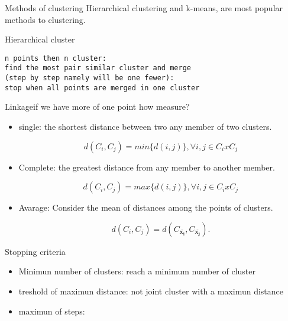 \documentclass{beamer}
\begin{document}
\begin{frame}{Methods of clustering}
Hierarchical clustering and k-means, are most popular methods to clustering.


\end{frame}


\begin{frame}[fragile]{Hierarchical cluster}

\begin{verbatim}
n points then n cluster:
find the most pair similar cluster and merge
(step by step namely will be one fewer):
stop when all points are merged in one cluster
\end{verbatim}

\end{frame}





\begin{frame}[fragile]{Linkage}{if we have more of one point how measure?}
\begin{itemize}
\item single: the shortest distance between two any member of two clusters.

\begin{equation}
d(C_{i},C_{j}) = min\{d(i,j)\}, \forall i,j \in C_{i}x C_{j}
\end{equation}

\item Complete: the greatest distance from any member to another member.


\begin{equation}
d(C_{i},C_{j}) = max\{d(i,j)\}, \forall i,j \in C_{i}x C_{j}
\end{equation}

\item Avarage: Consider the mean of distances among the points of clusters.

\begin{equation}
d(C_{i}, C_{j}) = d(C_{\bar{\bm{x_{i}}}} , C_{\bar{\bm{x_{j}}}}).
\end{equation}


\end{itemize}

\end{frame}




\begin{frame}{Stopping criteria}
\begin{itemize}
\item Minimun number of clusters: reach a minimum number of cluster
\item treshold of maximun distance: not joint cluster with a maximun distance
\item maximun of steps:

\end{itemize}

\end{frame}
\end{document}

